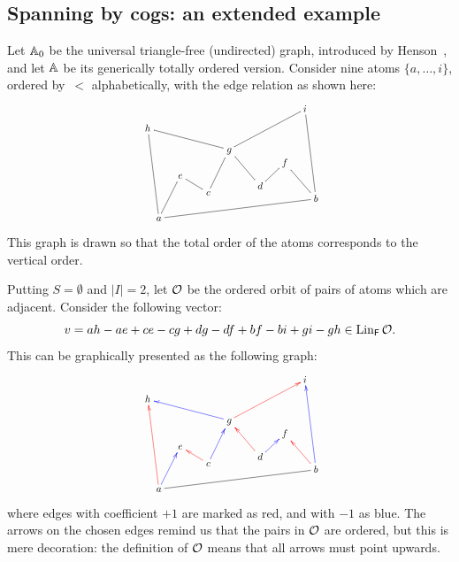 \subsection{Spanning by cogs: an extended example}
\label{ex:extended-example}
Let $\A_0$ be the universal triangle-free (undirected) graph, introduced by Henson~\cite{Henson1971}, and let $\A$ be its generically totally ordered version. 
Consider nine atoms $\{a,\ldots,i\}$, ordered by~$<$ alphabetically, with the edge relation as shown here:
\[\scalebox{0.8}{
\rotatebox{7}{
    \xymatrix@R=6pt@C=15pt{
    \rotatebox{-7}{$h$} & & & & & & \rotatebox{-7}{$i$} \\
    \\
    & & & \rotatebox{-7}{$g$}\ar@{-}[uulll]\ar@{-}[uurrr] \\
    & \rotatebox{-7}{$e$} & & & & \rotatebox{-7}{$f$} \\
    & & \rotatebox{-7}{$c$}\ar@{-}[ul]\ar@{-}[uur] & & \rotatebox{-7}{$d$}\ar@{-}[uul]\ar@{-}[ur] \\
    \rotatebox{-7}{$a$}\ar@{-}[rrrrrr]\ar@{-}[uuuuu]\ar@{-}[uur] & & & & & & \rotatebox{-7}{$b$}\ar@{-}[uul]\ar@{-}[uuuuu]
    }
}
}\]
This graph is drawn so that the total order of the atoms corresponds to the vertical order.

Putting $S=\emptyset$ and $|I|=2$, let ${\cal O}$ be the ordered orbit of pairs of atoms which are adjacent. 
Consider the following vector:
\[
    v = ah - ae + ce - cg + dg - df + bf - bi + gi - gh \in \Lin_\FF{\cal O}.
\]
This can be graphically presented as the following graph:
\[\scalebox{0.8}{
\rotatebox{7}{
    \xymatrix@R=6pt@C=15pt{
    \rotatebox{-7}{$h$} & & & & & & \rotatebox{-7}{$i$} \\
    \\
    & & & \rotatebox{-7}{$g$}\ar@[blue][uulll]\ar@[red][uurrr] \\
    & \rotatebox{-7}{$e$} & & & & \rotatebox{-7}{$f$} \\
    & & \rotatebox{-7}{$c$}\ar@[red][ul]\ar@[blue][uur] & & \rotatebox{-7}{$d$}\ar@[red][uul]\ar@[blue][ur] \\
    \rotatebox{-7}{$a$}\ar@{-}[rrrrrr]\ar@[red][uuuuu]\ar@[blue][uur] & & & & & & \rotatebox{-7}{$b$}\ar@[red][uul]\ar@[blue][uuuuu]
    }
}
}\]
where edges with coefficient $+1$ are marked as red, and with $-1$ as blue. 
The arrows on the chosen edges remind us that the pairs in $\cal O$ are ordered, but this is mere decoration: 
the definition of $\cal O$ means that all arrows must point upwards.

